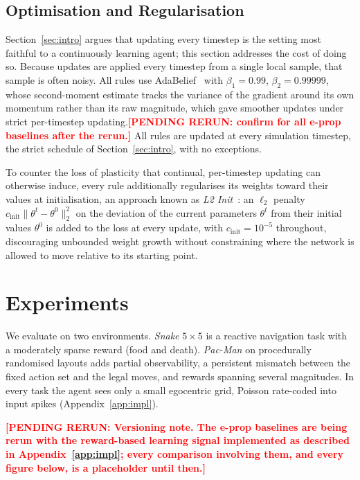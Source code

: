 \documentclass[10pt,twocolumn]{article}
\newcommand{\pending}[1]{\textcolor{red}{\bfseries[PENDING RERUN#1]}}
\begin{document}
\subsection{Optimisation and Regularisation}
\label{sec:optimiser}

Section~\ref{sec:intro} argues that updating every timestep is the setting
most faithful to a continuously learning agent; this section addresses the
cost of doing so.
Because updates are applied every timestep from a single local sample, that sample
is often noisy. All rules use AdaBelief~\citep{zhuang2020adabelief} with
$\beta_1=0.99$, $\beta_2=0.99999$, whose second-moment estimate tracks the variance of
the gradient around its own momentum rather than its raw magnitude, which gave smoother
updates under strict per-timestep updating.\pending{: confirm for all e-prop baselines
after the rerun.} All rules are updated at every simulation timestep, the strict
schedule of Section~\ref{sec:intro}, with no exceptions.

To counter the loss of plasticity that continual, per-timestep updating can
otherwise induce, every rule additionally regularises its weights toward
their values at initialisation, an approach known as \emph{L2
Init}~\citep{kumar2023maintaining}: an $\ell_2$ penalty
$c_{\mathrm{init}}\lVert\theta^t-\theta^0\rVert_2^2$ on the deviation of the
current parameters $\theta^t$ from their initial values $\theta^0$ is added
to the loss at every update, with $c_{\mathrm{init}}=10^{-5}$ throughout,
discouraging unbounded weight growth without constraining where the network
is allowed to move relative to its starting point.
\section{Experiments}
\label{sec:results}

We evaluate on two environments. \emph{Snake} $5\times5$ is a reactive navigation task
with a moderately sparse reward (food and death). \emph{Pac-Man} on procedurally
randomised layouts adds partial observability, a persistent mismatch between the fixed
action set and the legal moves, and rewards spanning several magnitudes. In every task
the agent sees only a small egocentric grid, Poisson rate-coded into input spikes
(Appendix~\ref{app:impl}).

\pending{: \textbf{Versioning note.} The e-prop baselines are being rerun with the
reward-based learning signal implemented as described in Appendix~\ref{app:impl}; every
comparison involving them, and every figure below, is a placeholder until then.}
\end{document}
